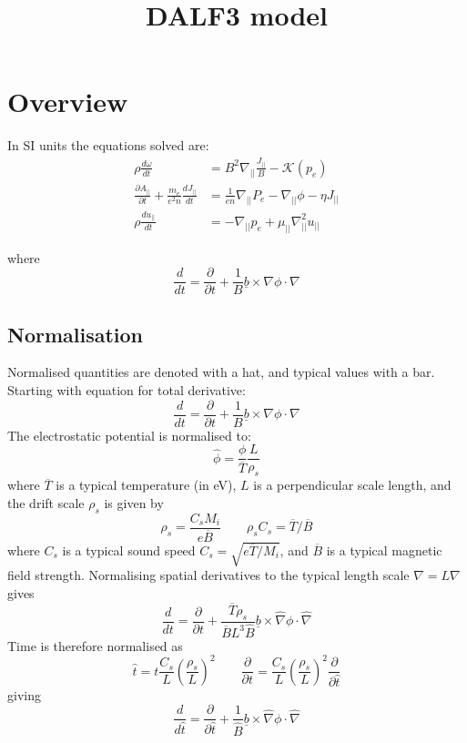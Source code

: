 \documentclass[12pt]{article}
\newcommand{\deriv}[2]{\ensuremath{\frac{\partial #1}{\partial #2}}}
\newcommand{\bvec}{\ensuremath{\underline{b}}}
\newcommand{\apar}{\ensuremath{A_{||}}}
\begin{document}
\title{DALF3 model}

\maketitle

\section{Overview}

In SI units the equations solved are:
\begin{align}
\rho\frac{d\omega}{dt} &= B^2\nabla_{||}\frac{J_{||}}{B} - \mathcal{K}\left(p_e\right) \\
\deriv{\apar}{t} + \frac{m_e}{e^2n}\frac{dJ_{||}}{dt} &= \frac{1}{en}\nabla_{||}P_e - \nabla_{||}\phi - \eta J_{||} \\
\rho\frac{du_{||}}{dt} &= -\nabla_{||}p_e + \mu_{||}\nabla_{||}^2u_{||}
\end{align}

where 
\[
\frac{d}{dt} = \deriv{}{t} + \frac{1}{B}\bvec\times\nabla\phi\cdot\nabla
\]

\subsection{Normalisation}

Normalised quantities are denoted with a hat, and typical values with a bar.
Starting with equation for total derivative:
\[
\frac{d}{dt} = \deriv{}{t} + \frac{1}{B}\bvec\times\nabla \phi \cdot\nabla
\]
The electrostatic potential is normalised to:
\[
\boxed{\hat{\phi} = \frac{\phi}{\overline{T}}\frac{L}{\rho_s}}
\]
where $\overline{T}$ is a typical temperature (in eV), $L$ is a perpendicular scale length, and
the drift scale $\rho_s$ is given by
\[
\rho_s = \frac{C_s M_i}{e\overline{B}} \qquad \rho_sC_s = \overline{T} / \overline{B}
\]
where $C_s$ is a typical sound speed $C_s = \sqrt{e\overline{T}/M_i}$, and $\overline{B}$ is a typical
magnetic field strength.
Normalising spatial derivatives to the typical length scale $\boxed{\hat{\nabla} = L\nabla}$ gives
\[
\frac{d}{dt} = \deriv{}{t} + \frac{\overline{T}\rho_s}{\overline{B}L^3\hat{B}}\bvec\times\hat{\nabla} \phi \cdot\hat{\nabla}
\]
Time is therefore normalised as
\[
\boxed{\hat{t} = t\frac{C_s}{L}\left(\frac{\rho_s}{L}\right)^2} \qquad \deriv{}{t} = \frac{C_s}{L}\left(\frac{\rho_s}{L}\right)^2\deriv{}{\hat{t}}
\]
giving
\[
\frac{d}{d\hat{t}} = \deriv{}{\hat{t}} + \frac{1}{\hat{B}}\bvec\times\hat{\nabla} \phi \cdot\hat{\nabla}
\]
\end{document}
